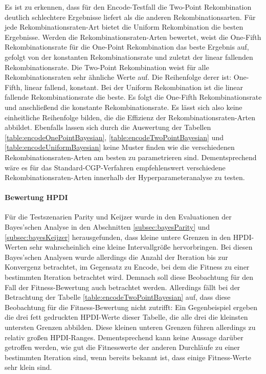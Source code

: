 Es ist zu erkennen, dass für den Encode-Testfall die Two-Point Rekombination deutlich schlechtere Ergebnisse liefert als die anderen Rekombinationsarten.
Für jede Re\-kom\-bi\-na\-tions\-ra\-ten-Art bietet die Uniform Rekombination die besten Ergebnisse.
Werden die Re\-kom\-bi\-na\-tions\-ra\-ten-Ar\-ten bewertet, weist die One-Fifth Rekombinationsrate für die One-Point Rekombination das beste Ergebnis auf, gefolgt von der konstanten Rekombinationsrate und zuletzt der linear fallenden Rekombinationsrate.
Die Two-Point Rekombination weist für alle Rekombinationsraten sehr ähnliche Werte auf.
Die Reihenfolge derer ist: One-Fifth, linear fallend, konstant.
Bei der Uniform Rekombination ist die linear fallende Rekombinationsrate die beste.
Es folgt die One-Fifth Rekombinationsrate und anschließend die konstante Rekombinationsrate.
Es lässt sich also keine einheitliche Reihenfolge bilden, die die Effizienz der Rekombinationsraten-Arten abbildet.
Ebenfalls lassen sich durch die Auswertung der Tabellen \ref{table:encodeOnePointBayesian}, \ref{table:encodeTwoPointBayesian} und \ref{table:encodeUniformBayesian} keine Muster finden wie die verschiedenen Re\-kom\-bi\-na\-tions\-ra\-ten-Ar\-ten am besten zu parametrieren sind.
Dementsprechend wäre es für das Standard-CGP-Verfahren empfehlenswert verschiedene Rekombinationsraten-Arten innerhalb der Hyperparameteranalyse zu testen.
\paragraph{Bewertung HPDI}
Für die Testszenarien Parity und Keijzer wurde in den Evaluationen der Bayes'schen Analyse in den Abschnitten \ref{subsec:bayesParity} und \ref{subsec:bayesKeijzer} herausgefunden, dass kleine untere Grenzen in den HPDI-Werten sehr wahrscheinlich eine kleine Intervallgröße hervorbringen.
Bei diesen Bayes'schen Analysen wurde allerdings die Anzahl der Iteration bis zur Konvergenz betrachtet, im Gegensatz zu Encode, bei dem die Fitness zu einer bestimmten Iteration betrachtet wird.
Demnach soll diese Beobachtung für den Fall der Fitness-Bewertung auch betrachtet werden.
Allerdings fällt bei der Betrachtung der Tabelle \ref{table:encodeTwoPointBayesian} auf, dass diese Beobachtung für die Fitness-Bewertung nicht zutrifft:
Ein Gegenbeispiel ergeben die drei fett gedruckten HPDI-Werte dieser Tabelle, die alle drei die kleinsten untersten Grenzen abbilden.
Diese kleinen unteren Grenzen führen allerdings zu relativ großen HPDI-Ranges.
Dementsprechend kann keine Aussage darüber getroffen werden, wie gut die Fitnesswerte der anderen Durchläufe zu einer bestimmten Iteration sind, wenn bereits bekannt ist, dass einige Fitness-Werte sehr klein sind.


